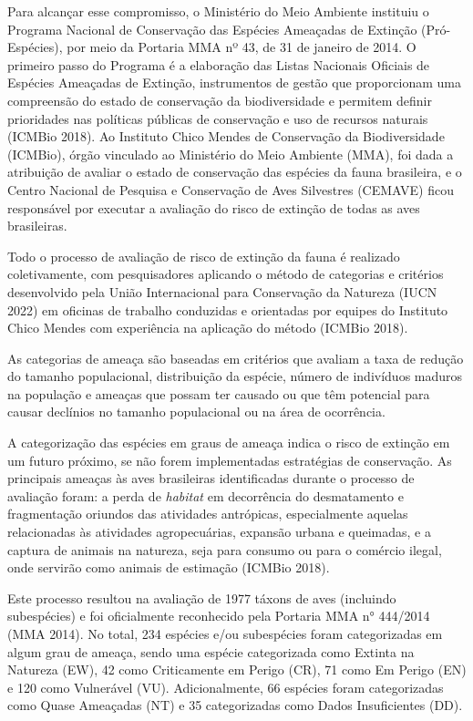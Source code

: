 \documentclass[
  oneside]{scrbook}
\begin{document}
Para alcançar esse compromisso, o Ministério do Meio Ambiente instituiu o Programa Nacional de Conservação das Espécies Ameaçadas de Extinção (Pró-Espécies), por meio da Portaria MMA nº 43, de 31 de janeiro de 2014. O primeiro passo do Programa é a elaboração das Listas Nacionais Oficiais de Espécies Ameaçadas de Extinção, instrumentos de gestão que proporcionam uma compreensão do estado de conservação da biodiversidade e permitem definir prioridades nas políticas públicas de conservação e uso de recursos naturais (ICMBio 2018). Ao Instituto Chico Mendes de Conservação da Biodiversidade (ICMBio), órgão vinculado ao Ministério do Meio Ambiente (MMA), foi dada a atribuição de avaliar o estado de conservação das espécies da fauna brasileira, e o Centro Nacional de Pesquisa e Conservação de Aves Silvestres (CEMAVE) ficou responsável por executar a avaliação do risco de extinção de todas as aves brasileiras.

Todo o processo de avaliação de risco de extinção da fauna é realizado coletivamente, com pesquisadores aplicando o método de categorias e critérios desenvolvido pela União Internacional para Conservação da Natureza (IUCN 2022) em oficinas de trabalho conduzidas e orientadas por equipes do Instituto Chico Mendes com experiência na aplicação do método (ICMBio 2018).

As categorias de ameaça são baseadas em critérios que avaliam a taxa de redução do tamanho populacional, distribuição da espécie, número de indivíduos maduros na população e ameaças que possam ter causado ou que têm potencial para causar declínios no tamanho populacional ou na área de ocorrência.

A categorização das espécies em graus de ameaça indica o risco de extinção em um futuro próximo, se não forem implementadas estratégias de conservação. As principais ameaças às aves brasileiras identificadas durante o processo de avaliação foram: a perda de \emph{habitat} em decorrência do desmatamento e fragmentação oriundos das atividades antrópicas, especialmente aquelas relacionadas às atividades agropecuárias, expansão urbana e queimadas, e a captura de animais na natureza, seja para consumo ou para o comércio ilegal, onde servirão como animais de estimação (ICMBio 2018).

Este processo resultou na avaliação de 1977 táxons de aves (incluindo subespécies) e foi oficialmente reconhecido pela Portaria MMA n° 444/2014 (MMA 2014). No total, 234 espécies e/ou subespécies foram categorizadas em algum grau de ameaça, sendo uma espécie categorizada como Extinta na Natureza (EW), 42 como Criticamente em Perigo (CR), 71 como Em Perigo (EN) e 120 como Vulnerável (VU). Adicionalmente, 66 espécies foram categorizadas como Quase Ameaçadas (NT) e 35 categorizadas como Dados Insuficientes (DD).
\end{document}
